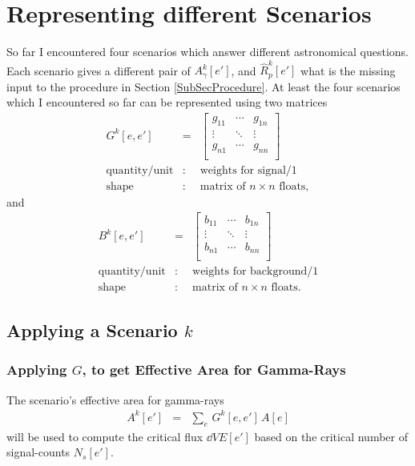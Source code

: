 \documentclass{article}%
\begin{document}
    \section{Representing different Scenarios}
        So far I encountered four scenarios which answer different astronomical questions.
        Each scenario gives a different pair of $A^k_\gamma[e']$, and $\hat{R}^k_p[e']$ what is the missing input to the procedure in Section \ref{SubSecProcedure}.
        At least the four scenarios which I encountered so far can be represented using two matrices
        \begin{eqnarray*}
            G^k[e, e'] &=&
              \left[ {\begin{array}{ccc}
                g_{11} & \cdots & g_{1n}\\
                \vdots & \ddots & \vdots\\
                g_{n1} & \cdots & g_{nn}\\
              \end{array} } \right]\\
            \text{quantity}/\text{unit} &:& \text{weights for signal}/1\\
            \text{shape} &:& \text{matrix of}\,\,n \times n \,\,\text{floats},
        \end{eqnarray*}
        and
        \begin{eqnarray*}
            B^k[e, e'] &=&
              \left[ {\begin{array}{cccc}
                b_{11} & \cdots & b_{1n}\\
                \vdots & \ddots & \vdots\\
                b_{n1} & \cdots & b_{nn}\\
              \end{array} } \right]\\
            \text{quantity}/\text{unit} &:& \text{weights for background}/1\\
            \text{shape} &:& \text{matrix of}\,\,n \times n \,\,\text{floats}.
        \end{eqnarray*}
        \subsection{Applying a Scenario $k$}
            \subsubsection*{Applying $G$, to get Effective Area for Gamma-Rays}
                The scenario's effective area for gamma-rays
                \begin{eqnarray}
                    A^k[e'] &=& \sum_{e} \, G^k[e, e'] \, A[e]
                \end{eqnarray}
                will be used to compute the critical flux $\dd{V}{E}[e']$ based on the critical number of signal-counts $N_s[e']$.
\end{document}
